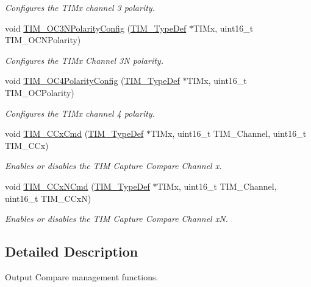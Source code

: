 \begin{DoxyCompactItemize}
\begin{DoxyCompactList}\small\item\em Configures the T\+I\+Mx channel 3 polarity. \end{DoxyCompactList}\item 
void \hyperlink{group___t_i_m___group2_gac710acc5b682e892584fc6f089f61dc2}{T\+I\+M\+\_\+\+O\+C3\+N\+Polarity\+Config} (\hyperlink{struct_t_i_m___type_def}{T\+I\+M\+\_\+\+Type\+Def} $\ast$T\+I\+Mx, uint16\+\_\+t T\+I\+M\+\_\+\+O\+C\+N\+Polarity)
\begin{DoxyCompactList}\small\item\em Configures the T\+I\+Mx Channel 3N polarity. \end{DoxyCompactList}\item 
void \hyperlink{group___t_i_m___group2_gad678410f7c7244f83daad93ce9d1056e}{T\+I\+M\+\_\+\+O\+C4\+Polarity\+Config} (\hyperlink{struct_t_i_m___type_def}{T\+I\+M\+\_\+\+Type\+Def} $\ast$T\+I\+Mx, uint16\+\_\+t T\+I\+M\+\_\+\+O\+C\+Polarity)
\begin{DoxyCompactList}\small\item\em Configures the T\+I\+Mx channel 4 polarity. \end{DoxyCompactList}\item 
void \hyperlink{group___t_i_m___group2_ga3ecc4647d9ede261beb5e0535cf29ebb}{T\+I\+M\+\_\+\+C\+Cx\+Cmd} (\hyperlink{struct_t_i_m___type_def}{T\+I\+M\+\_\+\+Type\+Def} $\ast$T\+I\+Mx, uint16\+\_\+t T\+I\+M\+\_\+\+Channel, uint16\+\_\+t T\+I\+M\+\_\+\+C\+Cx)
\begin{DoxyCompactList}\small\item\em Enables or disables the T\+IM Capture Compare Channel x. \end{DoxyCompactList}\item 
void \hyperlink{group___t_i_m___group2_ga304ff7c8a1615498da749bf2507e9f2b}{T\+I\+M\+\_\+\+C\+Cx\+N\+Cmd} (\hyperlink{struct_t_i_m___type_def}{T\+I\+M\+\_\+\+Type\+Def} $\ast$T\+I\+Mx, uint16\+\_\+t T\+I\+M\+\_\+\+Channel, uint16\+\_\+t T\+I\+M\+\_\+\+C\+CxN)
\begin{DoxyCompactList}\small\item\em Enables or disables the T\+IM Capture Compare Channel xN. \end{DoxyCompactList}\end{DoxyCompactItemize}


\subsection{Detailed Description}
Output Compare management functions. 

